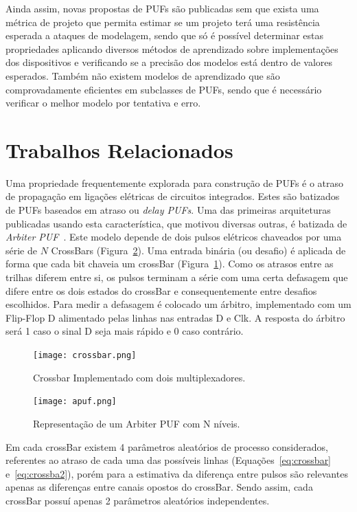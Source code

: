 \documentclass[pdftex,11pt]{article}
\begin{document}
\begin{spacing}{1.5}
Ainda assim, novas propostas de PUFs são publicadas sem que exista uma métrica de projeto que permita estimar se um projeto terá uma resistência esperada a ataques de modelagem, sendo que só é possível determinar estas propriedades aplicando diversos métodos de aprendizado sobre implementações dos dispositivos e verificando se a precisão dos modelos está dentro de valores esperados. Também não existem modelos de aprendizado que são comprovadamente eficientes em subclasses de PUFs, sendo que é necessário verificar o melhor modelo por tentativa e erro.


\section{Trabalhos Relacionados}\label{sec:relacionados}


    Uma propriedade frequentemente explorada para construção de PUFs é o atraso de propagação em ligações elétricas de circuitos integrados. Estes são batizados de PUFs baseados em atraso ou \textit{delay PUFs}\cite{bookspringerlink:10.1007}. Uma das primeiras arquiteturas publicadas usando esta característica, que motivou diversas outras, é batizada de \textit{Arbiter PUF}~\cite{GassendLCDD04}. Este modelo depende de dois pulsos elétricos chaveados por uma série de $N$ CrossBars (Figura~\ref{fig:apuf}). Uma entrada binária (ou desafio) é aplicada de forma que cada bit chaveia um crossBar (Figura~\ref{fig:crossbar}). Como os atrasos entre as trilhas diferem entre si, os pulsos terminam a série com uma certa defasagem que difere entre os dois estados do crossBar e consequentemente entre desafios escolhidos. Para medir a defasagem é colocado um árbitro, implementado com um Flip-Flop D alimentado pelas linhas nas entradas D e Clk. A resposta do árbitro será 1 caso o sinal D seja mais rápido e 0 caso contrário.


\begin{figure}
\centering
\label{fig:crossbar}
\texttt{[image: crossbar.png]}
\caption{Crossbar Implementado com dois multiplexadores.}
\end{figure}


\begin{figure}
\label{fig:apuf}
\centering
\texttt{[image: apuf.png]}
\caption{Representação de um Arbiter PUF com N níveis.}
\end{figure}


Em cada crossBar existem 4 parâmetros aleatórios de processo considerados, referentes ao atraso de cada uma das possíveis linhas (Equações~\ref{eq:crossbar} e~\ref{eq:crossba2}), porém para a estimativa da diferença entre pulsos são relevantes apenas as diferenças entre canais opostos do crossBar. Sendo assim, cada crossBar possuí apenas 2 parâmetros aleatórios independentes.


\end{spacing}
\end{document}
